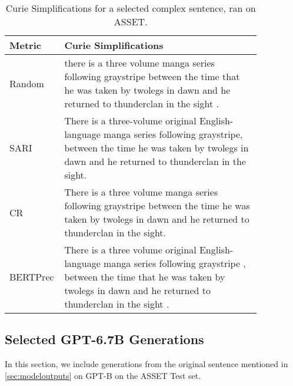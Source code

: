 \documentclass[11pt]{article}
\begin{document}
\begin{table*}[htbp]
         \centering
            \small
             \renewcommand{\arraystretch}{1.5}
        \begin{tabular}{p{0.1\linewidth} p{0.75\linewidth}} \toprule
        Metric   & Curie Simplifications \\   \midrule                                                                                                     
        Random   &  there is a three volume manga series following graystripe between the time that he was taken by twolegs in dawn and he returned to thunderclan in the sight .\\
        \midrule
        SARI   &  There is a three-volume original English-language manga series following graystripe, between the time he was taken by twolegs in dawn and he returned to thunderclan in the sight.\\
        \midrule
        CR   &  There is a three volume manga series following graystripe between the time he was taken by twolegs in dawn and he returned to thunderclan in the sight.\\
        \midrule
        BERTPrec   &  There is a three volume original English-language manga series following graystripe , between the time that he was taken by twolegs in dawn and he returned to thunderclan in the sight .\\ 
        \bottomrule
        \end{tabular}
        \caption{Curie Simplifications for a selected complex sentence, ran on ASSET.} 
         \label{tab:curie}
    \end{table*}

\subsection{Selected GPT-6.7B Generations}
\label{ssec:babbageasset}
In this section, we include generations from the original sentence mentioned in \ref{sec:modeloutputs} on GPT-B on the ASSET Test set.
\end{document}
